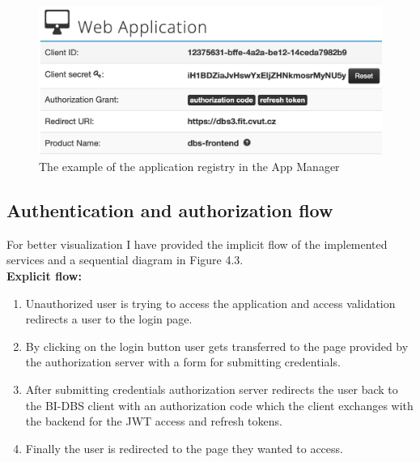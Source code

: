 \begin{figure}[hp]
\centering
\includegraphics[scale=0.54]{../png/app_manager.png}
\caption{The example of the application registry in the App Manager}
\end{figure}


\subsection{Authentication and authorization flow} For better visualization I have provided the implicit flow of the implemented services and a sequential diagram in Figure 4.3.\\

\noindent \textbf{Explicit flow:}

\begin{enumerate}
    \item Unauthorized user is trying to access the application and access validation redirects a user to the login page.
    \item By clicking on the login button user gets transferred to the page provided by the authorization server with a form for submitting credentials.
    \item After submitting credentials authorization server redirects the user back to the BI-DBS client with an authorization code which the client exchanges with the backend for the JWT access and refresh tokens.
    \item Finally the user is redirected to the page they wanted to access.
\end{enumerate}

